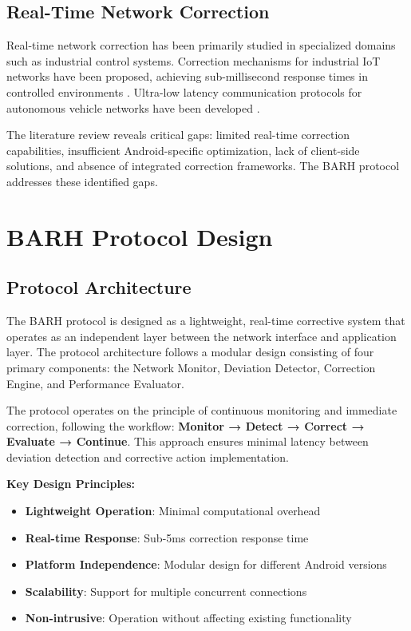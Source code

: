 \documentclass[conference]{IEEEtran}
\begin{document}
\subsection{Real-Time Network Correction}

Real-time network correction has been primarily studied in specialized domains such as industrial control systems. Correction mechanisms for industrial IoT networks have been proposed, achieving sub-millisecond response times in controlled environments \cite{ref7}. Ultra-low latency communication protocols for autonomous vehicle networks have been developed \cite{ref8}.

The literature review reveals critical gaps: limited real-time correction capabilities, insufficient Android-specific optimization, lack of client-side solutions, and absence of integrated correction frameworks. The BARH protocol addresses these identified gaps.

\section{BARH Protocol Design}

\subsection{Protocol Architecture}

The BARH protocol is designed as a lightweight, real-time corrective system that operates as an independent layer between the network interface and application layer. The protocol architecture follows a modular design consisting of four primary components: the Network Monitor, Deviation Detector, Correction Engine, and Performance Evaluator.

The protocol operates on the principle of continuous monitoring and immediate correction, following the workflow: \textbf{Monitor → Detect → Correct → Evaluate → Continue}. This approach ensures minimal latency between deviation detection and corrective action implementation.

\textbf{Key Design Principles:}
\begin{itemize}
\item \textbf{Lightweight Operation}: Minimal computational overhead
\item \textbf{Real-time Response}: Sub-5ms correction response time
\item \textbf{Platform Independence}: Modular design for different Android versions
\item \textbf{Scalability}: Support for multiple concurrent connections
\item \textbf{Non-intrusive}: Operation without affecting existing functionality
\end{itemize}
\end{document}
